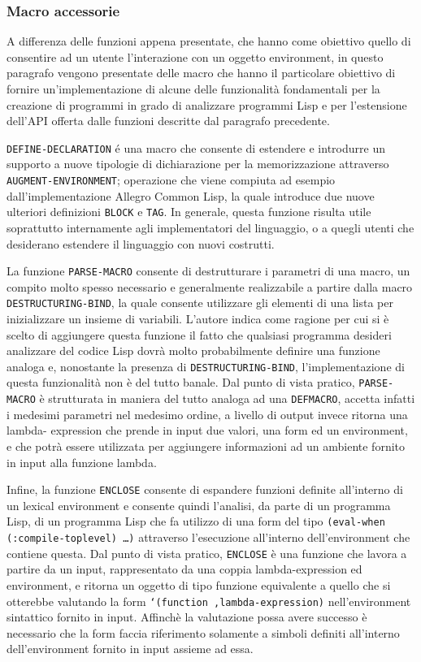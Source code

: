 \subsubsection{Macro accessorie}

A differenza delle funzioni appena presentate, che hanno come obiettivo quello
di consentire ad un utente l'interazione con un oggetto environment, in questo
paragrafo vengono presentate delle macro che hanno il particolare obiettivo di
fornire un'implementazione di alcune delle funzionalità fondamentali per la
creazione di programmi in grado di analizzare programmi Lisp e per l'estensione
dell'API offerta dalle funzioni descritte dal paragrafo precedente.

\texttt{DEFINE-DECLARATION} é una macro che consente di estendere e introdurre
un supporto a nuove tipologie di dichiarazione per la memorizzazione attraverso
\texttt {AUGMENT-ENVIRONMENT}; operazione che viene compiuta ad esempio
dall’implementazione Allegro Common Lisp, la quale introduce due nuove
ulteriori definizioni \texttt{BLOCK} e \texttt{TAG}. In generale, questa
funzione risulta utile soprattutto internamente agli implementatori del
linguaggio, o a quegli utenti che desiderano estendere il linguaggio con nuovi
costrutti.

La funzione \texttt{PARSE-MACRO} consente di destrutturare i parametri di una
macro, un compito molto spesso necessario e generalmente realizzabile a partire
dalla macro \texttt{DESTRUCTURING-BIND}, la quale consente utilizzare gli
elementi di una lista per inizializzare un insieme di variabili. L’autore
indica come ragione per cui si è scelto di aggiungere questa funzione il fatto
che qualsiasi programma desideri analizzare del codice Lisp dovrà molto
probabilmente definire una funzione analoga e, nonostante la presenza di
\texttt{DESTRUCTURING-BIND}, l’implementazione di questa funzionalità non è del
tutto banale. \cite{steele1990common} Dal punto di vista pratico, \texttt
{PARSE-MACRO} è strutturata in maniera del tutto analoga ad una
\texttt{DEFMACRO}, accetta infatti i medesimi parametri nel medesimo ordine, a
livello di output invece ritorna una lambda- expression che prende in input due
valori, una form ed un environment, e che potrà essere utilizzata per
aggiungere informazioni ad un ambiente fornito in input alla funzione lambda.

Infine, la funzione \texttt{ENCLOSE} consente di espandere funzioni definite
all’interno di un lexical environment e consente quindi l’analisi, da parte di
un programma Lisp, di un programma Lisp che fa utilizzo di una form del tipo
\texttt{(eval-when (:compile-toplevel) …)} attraverso l’esecuzione all’interno
dell’environment che contiene questa. Dal punto di vista pratico,
\texttt{ENCLOSE} è una funzione che lavora a partire da un input, rappresentato
da una coppia lambda-expression ed environment, e ritorna un oggetto di tipo
funzione equivalente a quello che si otterebbe valutando la form
\texttt{`(function ,lambda-expression)} nell'environment sintattico fornito in
input. Affinchè la valutazione possa avere successo è necessario che la form
faccia riferimento solamente a simboli definiti all'interno dell'environment
fornito in input assieme ad essa.
